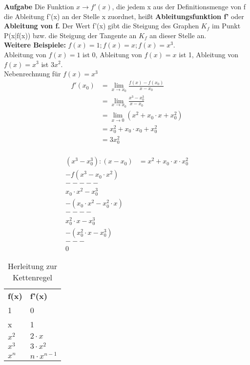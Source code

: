 \documentclass{book}
\begin{document}
\noindent\textbf{Aufgabe}
Die Funktion $x \to f'(x)$, die jedem x aus der Definitionsmenge von f die
Ableitung f'(x) an der Stelle x zuordnet, heißt \textbf{Ableitungsfunktion f'}
oder \textbf{Ableitung von f.} Der Wert f'(x) gibt die Steigung des Graphen
$K_f$ im Punkt P(x|f(x)) bzw. die Steigung der Tangente an $K_f$ an dieser
Stelle an.\\

\noindent \textbf{Weitere Beispiele:} $f(x)=1; f(x)=x; f(x)=x^3$.\\
Ableitung von $f(x)=1$ ist 0, Ableitung von $f(x)=x$ ist 1, Ableitung von
$f(x)=x^3$ ist $3x^2$.\\
Nebenrechnung für $f(x)=x^3$\\

\begin{align*}
f'(x_0) &= \lim_{x\to x_0}\frac{f(x)-f(x_0)}{x-x_0} \\ 
        &=\lim_{x\to x_0}\frac{x^3-x_0^3}{x-x_0}\\
        &=\lim_{x \to 0}(x^2+x_0\cdot x+x_0^2)\\
        &=x_0^2+x_0\cdot x_0+x_0^2\\
        &=3x_0^2\\
\end{align*}

\begin{align*}
  (x^3-x_0^3):(x-x_0)&=x^2+x_0\cdot x\cdot x_0^2\\
  -f(x^3-x_0\cdot x^2) \\
  -----\\
  x_0\cdot x^2-x_0^3 \\
  -(x_0\cdot x^2-x_0^2\cdot x)\\
  ----\\
  x_0^2\cdot x-x_0^3 \\ 
  -(x_0^2\cdot x-x_0^3)\\
  ---\\
  0
\end{align*}

\begin{table}[h]
  \label{tab:tablee-abl}
  \begin{center}
    \begin{tabular}[c]{l|l}
      \hline
      \multicolumn{1}{r|}{\textbf{f(x)}} & 
      \multicolumn{1}{l}{\textbf{f'(x)}} \\
      1 & 0 \\
      x & 1 \\
      $x^2$ & $2\cdot x$ \\
      $x^3$ & $3\cdot x^2$ \\
      $x^n$ & $n\cdot x^{n-1}$ \\
    \end{tabular}
  \end{center}
  \caption{Herleitung zur Kettenregel}
\end{table}
\end{document}
